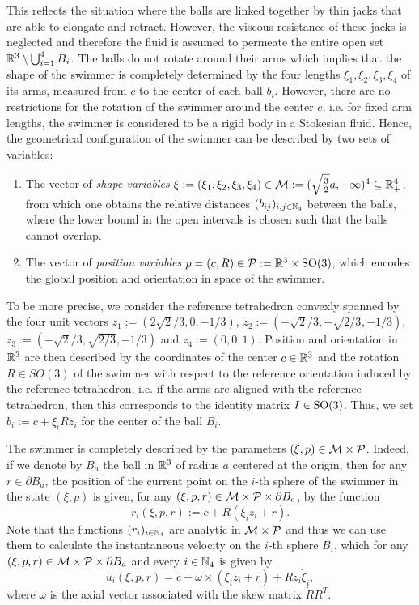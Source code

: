  This reflects the situation where the balls are linked together by thin jacks that are able to elongate and retract. However, the viscous resistance of these jacks is neglected and therefore the fluid is assumed to permeate the entire open set $\mathbb{R}^3 \setminus \bigcup_{i = 1}^{4} \overline{B}_i$. The balls do not rotate around their arms which implies that the shape of the swimmer is completely determined by the four lengths $\xi_1, \xi_2, \xi_3, \xi_4$ of its arms, measured from $c$ to the center of each ball $b_i$. However, there are no restrictions for the rotation of the swimmer around the center $c$, i.e. for fixed arm lengths, the swimmer is considered to be a rigid body in a Stokesian fluid.
Hence, the geometrical configuration of the swimmer can be described by two sets of variables:
\begin{enumerate}
	\item The vector of \emph{shape variables} $\xi := (\xi_1, \xi_2, \xi_3, \xi_4) \in \mathcal{M} := (\sqrt{\tfrac{3}{2}}a, +\infty)^4 \subseteq \mathbb{R}_+^4$, from which one obtains the relative distances $(b_{ij})_{i,j \in \mathbb{N}_4}$ between the balls,  where the lower bound in the open intervals is chosen such that the balls cannot overlap.
	\item The vector of \emph{position variables} $p = (c, R) \in \mathcal{P} :=  \mathbb{R}^3 \times \operatorname{SO}(3)$, which encodes the global position and orientation in space of the swimmer.
\end{enumerate}
To be more precise, we consider the reference tetrahedron convexly spanned by the four unit vectors $z_1 := (2 \sqrt{2}/3,0,-1/3)$, $z_2 := (-\sqrt{2}/3,-\sqrt{2/3},-1/3)$, $z_3 := (-\sqrt{2}/3,\sqrt{2/3},-1/3)$ and $z_4 := (0,0,1)$. Position and orientation in $\mathbb{R}^3$ are then described by the coordinates of the center $c \in \mathbb{R}^3$ and the rotation $R \in SO(3)$ of the swimmer with respect to the reference orientation induced by the reference tetrahedron, i.e. if the arms are aligned with the reference tetrahedron, then this corresponds to the identity matrix $I \in \operatorname{SO}(3)$. Thus, we set $b_i := c + \xi_i R z_i$ for the center of the ball $B_i$.

The swimmer is completely described by the parameters $(\xi, p) \in \mathcal{M} \times \mathcal{P}$. Indeed, if we denote by $B_a$ the ball in $\mathbb{R}^3$ of radius $a$ centered at the origin, then for any $r \in \partial B_a$, the position of the current point on the $i$-th sphere of the swimmer in the state $(\xi, p)$ is given, for any $(\xi, p, r) \in \mathcal{M} \times \mathcal{P} \times \partial B_a$, by the function
\begin{equation}
	r_i(\xi, p, r) :=  c + R(\xi_i z_i + r).
\end{equation}
Note that the functions $(r_i)_{i \in \mathbb{N}_4}$ are analytic in $\mathcal{M}  \times \mathcal{P}$ and thus we can use them to calculate the instantaneous velocity on the $i$-th sphere $B_i$, which for any $(\xi, p, r) \in \mathcal{M} \times \mathcal{P} \times \partial B_a$ and every $i \in \mathbb{N}_4$ is given by
\begin{equation}
\label{eq:velocity}
	u_i(\xi, p, r) = \dot{c} + \omega \times (\xi_i z_i + r) + R z_i \dot{\xi}_i,
\end{equation}
where $\omega$ is the axial vector associated with the skew matrix $\dot{R} R^T$.

